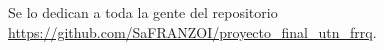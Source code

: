 Se lo dedican a toda la gente del repositorio \url{https://github.com/SaFRANZOI/proyecto_final_utn_frrq}. \\
\newpage
 